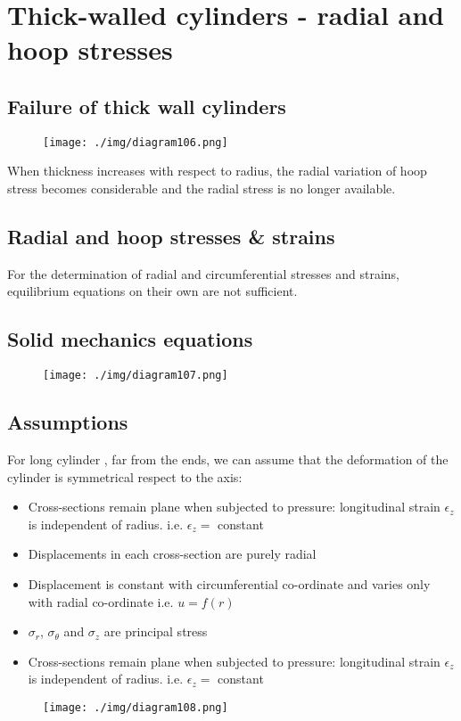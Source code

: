 \section{Thick-walled cylinders - radial and hoop stresses}
\subsection{Failure of thick wall cylinders}
\begin{figure}[H]
  \centering
  \texttt{[image: ./img/diagram106.png]}
  \caption{}
\end{figure}
When thickness increases with respect to radius, the radial variation of hoop stress becomes considerable and the radial stress is no longer available.
\subsection{Radial and hoop stresses \& strains}
For the determination of radial and circumferential stresses and strains, equilibrium equations on their own are not sufficient.
\subsection{Solid mechanics equations}
\begin{figure}[H]
  \centering
  \texttt{[image: ./img/diagram107.png]}
  \caption{}
\end{figure}
\subsection{Assumptions}
For long cylinder , far from the ends, we can assume that the deformation of the cylinder is symmetrical respect to the axis:
\begin{itemize}
  \item Cross-sections remain plane when subjected to pressure: longitudinal strain $\epsilon_z$ is independent of radius. i.e. $\epsilon_z =$ constant
  \item Displacements in each cross-section are purely radial
  \item Displacement is constant with circumferential co-ordinate and varies only with radial co-ordinate i.e. $u=f(r)$
  \item $\sigma_r$, $\sigma_{\theta}$ and $\sigma_z$ are principal stress
  \item Cross-sections remain plane when subjected to pressure: longitudinal strain $\epsilon_z$ is independent of radius. i.e. $\epsilon_z =$ constant
\end{itemize}
\begin{figure}[H]
  \centering
  \texttt{[image: ./img/diagram108.png]}
  \caption{}
\end{figure}
